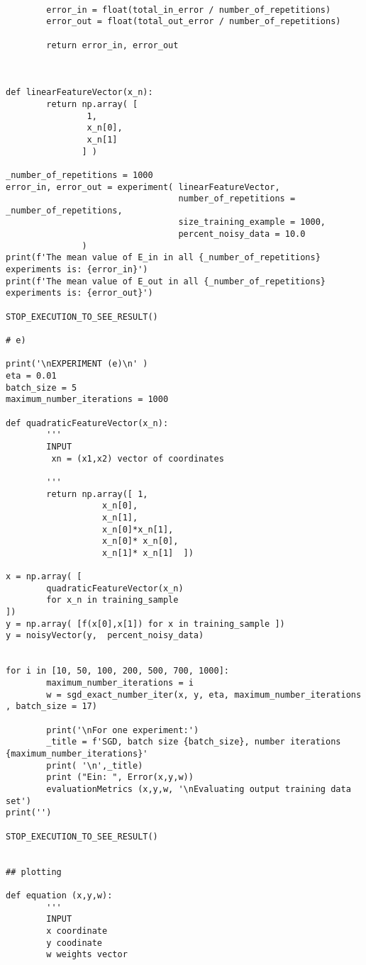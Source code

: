 \begin{verbatim}
                
        error_in = float(total_in_error / number_of_repetitions)
        error_out = float(total_out_error / number_of_repetitions)

        return error_in, error_out



def linearFeatureVector(x_n):
        return np.array( [
                1,
                x_n[0],
                x_n[1]
               ] )

_number_of_repetitions = 1000 
error_in, error_out = experiment( linearFeatureVector,
                                  number_of_repetitions = _number_of_repetitions,
                                  size_training_example = 1000,
                                  percent_noisy_data = 10.0
               )
print(f'The mean value of E_in in all {_number_of_repetitions} experiments is: {error_in}')
print(f'The mean value of E_out in all {_number_of_repetitions} experiments is: {error_out}')

STOP_EXECUTION_TO_SEE_RESULT()

# e)

print('\nEXPERIMENT (e)\n' )
eta = 0.01
batch_size = 5
maximum_number_iterations = 1000

def quadraticFeatureVector(x_n):
        '''
        INPUT 
         xn = (x1,x2) vector of coordinates 
        
        '''
        return np.array([ 1,
                   x_n[0],
                   x_n[1],
                   x_n[0]*x_n[1],
                   x_n[0]* x_n[0],
                   x_n[1]* x_n[1]  ])

x = np.array( [
        quadraticFeatureVector(x_n)
        for x_n in training_sample
])
y = np.array( [f(x[0],x[1]) for x in training_sample ])
y = noisyVector(y,  percent_noisy_data)


for i in [10, 50, 100, 200, 500, 700, 1000]:
        maximum_number_iterations = i
        w = sgd_exact_number_iter(x, y, eta, maximum_number_iterations , batch_size = 17)

        print('\nFor one experiment:')
        _title = f'SGD, batch size {batch_size}, number iterations {maximum_number_iterations}'
        print( '\n',_title)
        print ("Ein: ", Error(x,y,w))
        evaluationMetrics (x,y,w, '\nEvaluating output training data set')
print('')

STOP_EXECUTION_TO_SEE_RESULT()


## plotting

def equation (x,y,w):
        '''
        INPUT 
        x coordinate
        y coodinate 
        w weights vector
        

\end{verbatim}
